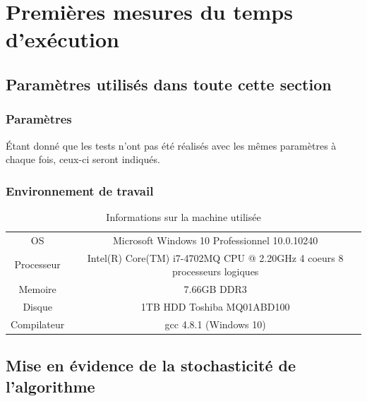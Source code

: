 
\section{Premières mesures du temps d'exécution}

\subsection{Paramètres utilisés dans toute cette section}


\subsubsection{Paramètres}

Étant donné que les tests n'ont pas été réalisés avec les mêmes paramètres à chaque fois, ceux-ci seront indiqués.


\subsubsection{Environnement de travail}
\begin{table}[H]
	\centering
	\caption{Informations sur la machine utilisée}
	\label{tab:environnementTravail}
	\begin{tabular}{c|c}
		\toprule
		OS & Microsoft Windows 10 Professionnel 10.0.10240\\
		Processeur & Intel(R) Core(TM) i7-4702MQ CPU @ 2.20GHz 4 coeurs 8 processeurs logiques\\
		Memoire & 7.66GB DDR3\\
		Disque & 1TB HDD Toshiba MQ01ABD100\\
		Compilateur & gcc 4.8.1 (Windows 10)\\
		\bottomrule
	\end{tabular}
\end{table}


\subsection{Mise en évidence de la stochasticité de l'algorithme}

